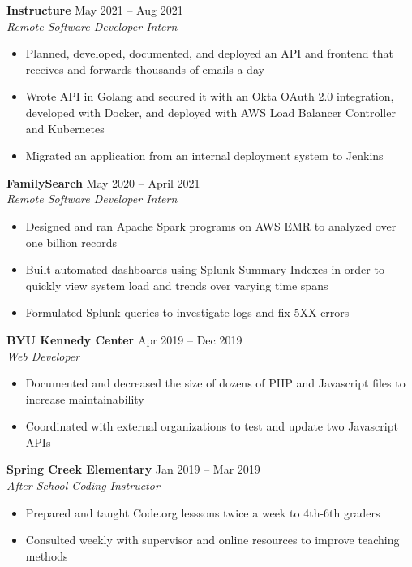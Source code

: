 \documentclass[letterpaper]{article}
\begin{document}
\textbf{Instructure} \hfill May 2021 -- Aug 2021\\
\textit{Remote Software Developer Intern}\\
\vspace{-1mm}
\begin{itemize} \itemsep 1pt
	\item Planned, developed, documented, and deployed an API and frontend that receives and forwards thousands of emails a day
	\item Wrote API in Golang and secured it with an Okta OAuth 2.0 integration, developed with Docker, and deployed with AWS Load Balancer Controller and Kubernetes
	\item Migrated an application from an internal deployment system to Jenkins
\end{itemize}
\textbf{FamilySearch} \hfill May 2020 -- April 2021\\
\textit{Remote Software Developer Intern}\\
\vspace{-1mm}
\begin{itemize} \itemsep 1pt
	\item Designed and ran Apache Spark programs on AWS EMR to analyzed over one billion records
	\item Built automated dashboards using Splunk Summary Indexes in order to quickly view system load and trends over varying time spans
	\item Formulated Splunk queries to investigate logs and fix 5XX errors
    
\end{itemize}
\textbf{BYU Kennedy Center} \hfill Apr 2019 -- Dec 2019\\
\textit{Web Developer}\\
\vspace{-1mm}
\begin{itemize} \itemsep 1pt
	\item Documented and decreased the size of dozens of PHP and Javascript files to increase maintainability
	\item Coordinated with external organizations to test and update two Javascript APIs
\end{itemize}
\textbf{Spring Creek Elementary} \hfill Jan 2019 -- Mar 2019\\
\textit{After School Coding Instructor}\\
\vspace{-1mm}
\begin{itemize} \itemsep 1pt
	\item Prepared and taught Code.org lesssons twice a week to 4th-6th graders
	\item Consulted weekly with supervisor and online resources to improve teaching methods
\end{itemize}
\end{document}
